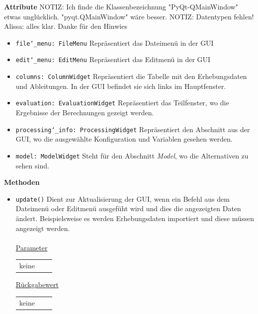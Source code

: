 \documentclass{article}
\begin{document}
\textbf{{Attribute}}
NOTIZ: Ich finde die Klassenbezeichnung "PyQt-QMainWindow" etwas unglücklich. "pyqt.QMainWindow" wäre besser.
NOTIZ: Datentypen fehlen! Alissa: alles klar. Danke für den Hinwies
\begin{itemize}
\item \texttt{file\char`_menu: FileMenu} \newline Repräsentiert das Dateimenü in der GUI
\item \texttt{edit\char`_menu: EditMenu} \newline Repräsentiert das Editmenü in der GUI
\item \texttt{columns: ColumnWidget} \newline Repräsentiert die Tabelle mit den Erhebungsdaten und Ableitungen. In der GUI befindet sie sich links im Hauptfenster.
\item \texttt{evaluation: EvaluationWidget} \newline Repräsentiert das Teilfenster, wo die Ergebnisse der Berechnungen gezeigt werden.
\item \texttt{processing\char`_info: ProcessingWidget} \newline Repräsentiert den Abschnitt aus der GUI, wo die ausgewählte Konfiguration und Variablen gesehen werden.
\item \texttt{model: ModelWidget} \newline Steht für den Abschnitt \textit{Model}, wo die Alternativen zu sehen sind.
\end{itemize}

\textbf{{Methoden}}
\begin{itemize}
\item \texttt{update()} \newline Dient zur Aktualisierung der GUI, wenn ein Befehl aus dem Dateimenü oder Editmenü ausgefüht wird und dies die angezeigten Daten ändert. Beispielsweise es werden Erhebungsdaten importiert und diese müssen angezeigt werden.
\\\\
\underline{{Parameter}}
\begin{tabular}{lll}
 keine \\
\end{tabular}

\underline{{Rückgabewert}}
\begin{tabular}{lll}
 keine \\
\end{tabular}
\end{itemize}
\end{document}
